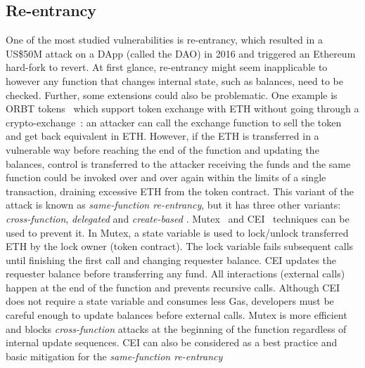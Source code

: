 \subsection{Re-entrancy}\label{subsec:ent}
One of the most studied vulnerabilities is re-entrancy, which resulted in a US\$50M attack on a DApp (called the DAO) in 2016 and triggered an Ethereum hard-fork to revert\cite{DAO1}. At first glance, re-entrancy might seem inapplicable to \erc however any function that changes internal state, such as balances, need to be checked. Further, some \erc extensions could also be problematic. One example is ORBT tokens~\cite{ORBTToken} which support token exchange with ETH without going through a crypto-exchange~\cite{ORBT}: an attacker can call the exchange function to sell the token and get back equivalent in ETH. However, if the ETH is transferred in a vulnerable way before reaching the end of the function and updating the balances, control is transferred to the attacker receiving the funds and the same function could be invoked over and over again within the limits of a single transaction, draining excessive ETH from the token contract. This variant of the attack is known as \textit{same-function re-entrancy}, but it has three other variants: \textit{cross-function}, \textit{delegated} and \textit{create-based} \cite{SEREUM}. Mutex~\cite{WiKiMutex} and CEI~\cite{SolidtyDocSec} techniques can be used to prevent it. In Mutex, a state variable is used to lock/unlock transferred ETH by the lock owner (\ie token contract). The lock variable fails subsequent calls until finishing the first call and changing requester balance. CEI updates the requester balance before transferring any fund. All interactions (\ie external calls) happen at the end of the function and prevents recursive calls. Although CEI does not require a state variable and consumes less Gas, developers must be careful enough to update balances before external calls. Mutex is more efficient and blocks \textit{cross-function} attacks at the beginning of the function regardless of internal update sequences. CEI can also be considered as a best practice and basic mitigation for the \textit{same-function re-entrancy}

